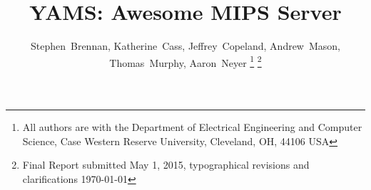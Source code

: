 \documentclass[journal,10pt]{IEEEtran}
\begin{document}
%
\title{YAMS: Awesome MIPS Server}

%
%
%

\author{
Stephen~Brennan,
Katherine~Cass,
Jeffrey~Copeland,
Andrew~Mason,
Thomas~Murphy,
Aaron~Neyer%
\thanks{All authors are with the Department of Electrical Engineering and Computer Science, Case Western Reserve University, Cleveland, OH, 44106 USA}%
\thanks{Final Report submitted May 1, 2015, typographical revisions and clarifications \today}
} %

%
%



%
{}
\end{document}
